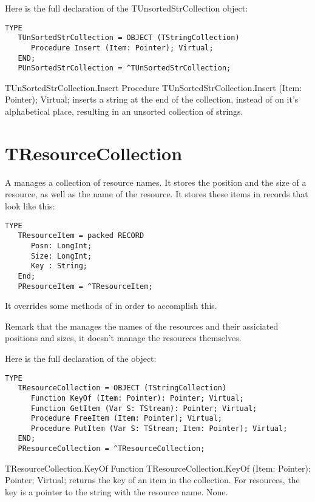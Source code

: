 Here is the full declaration of the {TUnsortedStrCollection} object:
\begin{verbatim}
TYPE
   TUnSortedStrCollection = OBJECT (TStringCollection)
      Procedure Insert (Item: Pointer); Virtual;
   END;
   PUnSortedStrCollection = ^TUnSortedStrCollection;
\end{verbatim}

\begin{procedure}{TUnSortedStrCollection.Insert}
\Declaration
Procedure TUnSortedStrCollection.Insert (Item: Pointer); Virtual;
\Description
{} inserts a string at the end of the collection, instead
of on it's alphabetical place, resulting in an unsorted collection of
strings. 
\Errors
\SeeAlso
\end{procedure}



\section{TResourceCollection}
\label{se:TResourceCollection}

A  manages a collection of resource names. 
It stores the position and the size of a resource, as well as the name of
the resource. It stores these items in records that look like this:
\begin{verbatim}
TYPE
   TResourceItem = packed RECORD
      Posn: LongInt;
      Size: LongInt;
      Key : String;
   End;
   PResourceItem = ^TResourceItem;
\end{verbatim}

It overrides some methods of  in order to accomplish
this. 

Remark that the  manages the names of the
resources and their assiciated positions and sizes, it doesn't manage
the resources themselves.

Here is the full declaration of the  object:
\begin{verbatim}
TYPE
   TResourceCollection = OBJECT (TStringCollection)
      Function KeyOf (Item: Pointer): Pointer; Virtual;
      Function GetItem (Var S: TStream): Pointer; Virtual;
      Procedure FreeItem (Item: Pointer); Virtual;
      Procedure PutItem (Var S: TStream; Item: Pointer); Virtual;
   END;
   PResourceCollection = ^TResourceCollection;
\end{verbatim}

\begin{function}{TResourceCollection.KeyOf}
\Declaration
Function TResourceCollection.KeyOf (Item: Pointer): Pointer; Virtual;
\Description
{} returns the key of an item in the collection. For resources, the
key is a pointer to the string with the resource name.
\Errors
None.
\SeeAlso
{}
\end{function}

